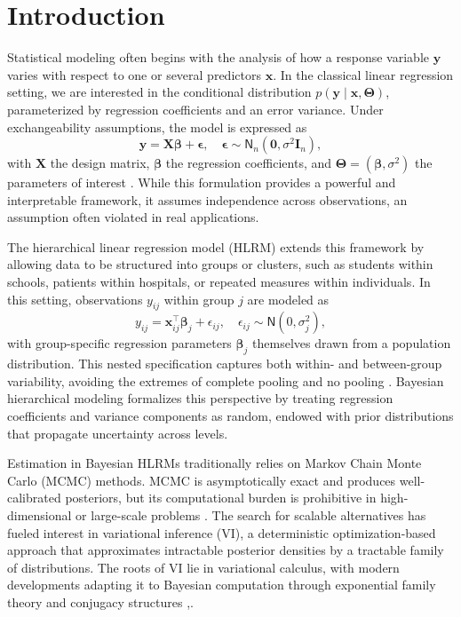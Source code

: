 \chapter{Introduction}

Statistical modeling often begins with the analysis of how a response variable $\bm{y}$ varies with respect to one or several predictors $\bm{x}$. In the classical linear regression setting, we are interested in the conditional distribution $p(\bm{y}\mid\bm{x},\bm{\Theta})$, parameterized by regression coefficients and an error variance. Under exchangeability assumptions, the model is expressed as
\[
\bm{y} = \bm{X}\bm{\beta} + \bm{\epsilon}, \quad \bm{\epsilon} \sim \mathsf{N}_n(\bm{0}, \sigma^2 \bm{I}_n),
\]
with $\bm{X}$ the design matrix, $\bm{\beta}$ the regression coefficients, and $\bm{\Theta}=(\bm{\beta},\sigma^2)$ the parameters of interest \cite{GELMAN14}. While this formulation provides a powerful and interpretable framework, it assumes independence across observations, an assumption often violated in real applications.

\medskip

The hierarchical linear regression model (HLRM) extends this framework by allowing data to be structured into groups or clusters, such as students within schools, patients within hospitals, or repeated measures within individuals. In this setting, observations $y_{ij}$ within group $j$ are modeled as
\[
y_{ij} = \bm{x}_{ij}^\top \bm{\beta}_j + \epsilon_{ij}, \quad \epsilon_{ij} \sim \mathsf{N}(0,\sigma_j^2),
\]
with group-specific regression parameters $\bm{\beta}_j$ themselves drawn from a population distribution. This nested specification captures both within- and between-group variability, avoiding the extremes of complete pooling and no pooling \cite{HOFF,SOSA}. Bayesian hierarchical modeling formalizes this perspective by treating regression coefficients and variance components as random, endowed with prior distributions that propagate uncertainty across levels.

\medskip

Estimation in Bayesian HLRMs traditionally relies on Markov Chain Monte Carlo (MCMC) methods. MCMC is asymptotically exact and produces well-calibrated posteriors, but its computational burden is prohibitive in high-dimensional or large-scale problems \cite{GELMAN14}. The search for scalable alternatives has fueled interest in variational inference (VI), a deterministic optimization-based approach that approximates intractable posterior densities by a tractable family of distributions. The roots of VI lie in variational calculus, with modern developments adapting it to Bayesian computation through exponential family theory and conjugacy structures \cite{Diaconis1979-lb, Wainwright2007-ul},\cite{NIPS2000_77369e37,beal2003variational}. 

